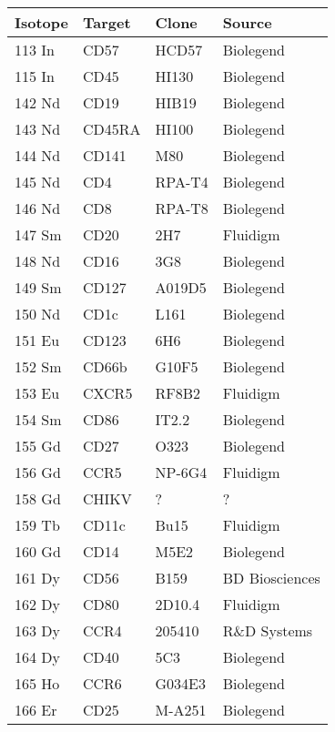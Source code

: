 \begin{table*}[hp]
  \small
  \begin{tabular}{l l l l}
    \toprule
    Isotope & Target & Clone & Source \\
    \midrule
    113 In & CD57 & HCD57 & Biolegend \\
    115 In & CD45 & HI130 & Biolegend \\
    142 Nd & CD19 & HIB19 & Biolegend \\
    143 Nd & CD45RA & HI100 & Biolegend \\
    144 Nd & CD141 & M80 & Biolegend \\
    145 Nd & CD4 & RPA-T4 & Biolegend \\
    146 Nd & CD8 & RPA-T8 & Biolegend \\
    147 Sm & CD20 & 2H7 & Fluidigm \\
    148 Nd & CD16 & 3G8 & Biolegend \\
    149 Sm & CD127 & A019D5 & Biolegend \\
    150 Nd & CD1c & L161 & Biolegend \\
    151 Eu & CD123 & 6H6 & Biolegend \\
    152 Sm & CD66b & G10F5 & Biolegend \\
    153 Eu & CXCR5 & RF8B2 & Fluidigm \\
    154 Sm & CD86 & IT2.2 & Biolegend \\
    155 Gd & CD27 & O323 & Biolegend \\
    156 Gd & CCR5 & NP-6G4 & Fluidigm \\
    158 Gd & CHIKV & ? & ? \\
    159 Tb & CD11c & Bu15 & Fluidigm \\
    160 Gd & CD14 & M5E2 & Biolegend \\
    161 Dy & CD56 & B159 & BD Biosciences \\
    162 Dy & CD80 & 2D10.4 & Fluidigm \\
    163 Dy & CCR4 & 205410 & R\&D Systems \\
    164 Dy & CD40 & 5C3 & Biolegend \\
    165 Ho & CCR6 & G034E3 & Biolegend \\
    166 Er & CD25 & M-A251 & Biolegend \\

\end{tabular}
\end{table*}
